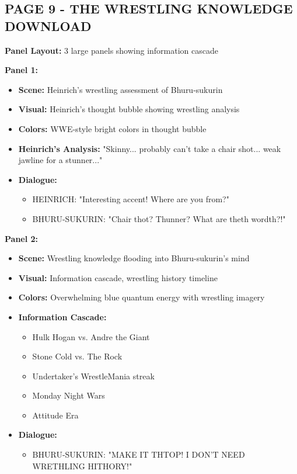 \documentclass[12pt,a4paper]{article}
\begin{document}
\subsection{PAGE 9 - THE WRESTLING KNOWLEDGE DOWNLOAD}

\textbf{Panel Layout:} 3 large panels showing information cascade

\textbf{Panel 1:}
\begin{itemize}
\item \textbf{Scene:} Heinrich's wrestling assessment of Bhuru-sukurin
\item \textbf{Visual:} Heinrich's thought bubble showing wrestling analysis
\item \textbf{Colors:} WWE-style bright colors in thought bubble
\item \textbf{Heinrich's Analysis:} "Skinny... probably can't take a chair shot... weak jawline for a stunner..."
\item \textbf{Dialogue:}
\begin{itemize}
\item HEINRICH: "Interesting accent! Where are you from?"
\item BHURU-SUKURIN: "Chair thot? Thunner? What are theth wordth?!"
\end{itemize}
\end{itemize}

\textbf{Panel 2:}
\begin{itemize}
\item \textbf{Scene:} Wrestling knowledge flooding into Bhuru-sukurin's mind
\item \textbf{Visual:} Information cascade, wrestling history timeline
\item \textbf{Colors:} Overwhelming blue quantum energy with wrestling imagery
\item \textbf{Information Cascade:}
\begin{itemize}
\item Hulk Hogan vs. Andre the Giant
\item Stone Cold vs. The Rock
\item Undertaker's WrestleMania streak
\item Monday Night Wars
\item Attitude Era
\end{itemize}
\item \textbf{Dialogue:}
\begin{itemize}
\item BHURU-SUKURIN: "MAKE IT THTOP! I DON'T NEED WRETHLING HITHORY!"
\end{itemize}
\end{itemize}
\end{document}

